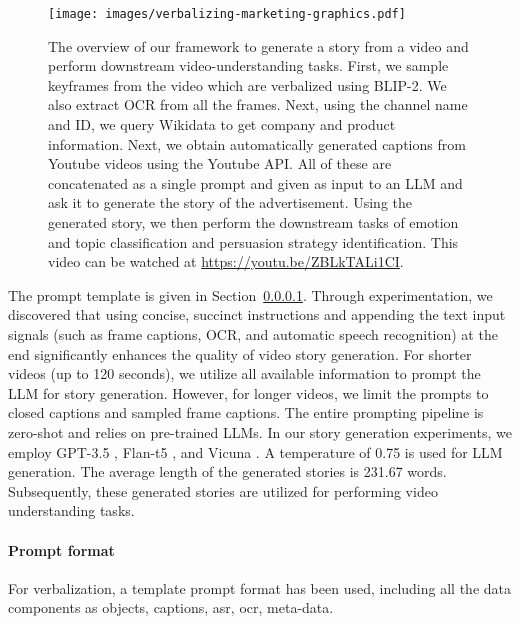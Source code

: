\begin{landscape}
\begin{figure}
  \texttt{[image: images/verbalizing-marketing-graphics.pdf]}
  \caption{The overview of our framework to generate a story from a video and perform downstream video-understanding tasks. First, we sample keyframes from the video which are verbalized using BLIP-2. We also extract OCR from all the frames. Next, using the channel name and ID, we query Wikidata to get company and product information. Next, we obtain automatically generated captions from Youtube videos using the Youtube API. All of these are concatenated as a single prompt and given as input to an LLM and ask it to generate the story of the advertisement. Using the generated story, we then perform the downstream tasks of emotion and topic classification and persuasion strategy identification. This video can be watched at \url{https://youtu.be/ZBLkTALi1CI}.
  }
  \label{fig:story-generation-pipeline}
\end{figure}
\end{landscape}








The prompt template is given in Section~\ref{sec:prompt-format}. Through experimentation, we discovered that using concise, succinct instructions and appending the text input signals (such as frame captions, OCR, and automatic speech recognition) at the end significantly enhances the quality of video story generation. For shorter videos (up to 120 seconds), we utilize all available information to prompt the LLM for story generation. However, for longer videos, we limit the prompts to closed captions and sampled frame captions. The entire prompting pipeline is zero-shot and relies on pre-trained LLMs. In our story generation experiments, we employ GPT-3.5 \cite{brown2020language}, Flan-t5 \cite{chung2022scaling}, and Vicuna \cite{vicuna2023}. A temperature of 0.75 is used for LLM generation. The average length of the generated stories is 231.67 words. Subsequently, these generated stories are utilized for performing video understanding tasks.



\paragraph{Prompt format} 
\label{sec:prompt-format}
 For verbalization, a template prompt format has been used, including all the data components as objects, captions, asr, ocr, meta-data. 

